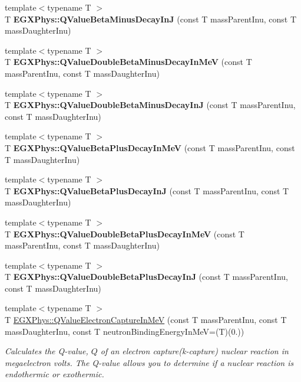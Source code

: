 \begin{DoxyCompactItemize}
{\footnotesize template$<$typename T $>$ }\\T {\bfseries E\+G\+X\+Phys\+::\+Q\+Value\+Beta\+Minus\+Decay\+InJ} (const T mass\+Parent\+Inu, const T mass\+Daughter\+Inu)
\item 
{\footnotesize template$<$typename T $>$ }\\T {\bfseries E\+G\+X\+Phys\+::\+Q\+Value\+Double\+Beta\+Minus\+Decay\+In\+MeV} (const T mass\+Parent\+Inu, const T mass\+Daughter\+Inu)
\item 
{\footnotesize template$<$typename T $>$ }\\T {\bfseries E\+G\+X\+Phys\+::\+Q\+Value\+Double\+Beta\+Minus\+Decay\+InJ} (const T mass\+Parent\+Inu, const T mass\+Daughter\+Inu)
\item 
{\footnotesize template$<$typename T $>$ }\\T {\bfseries E\+G\+X\+Phys\+::\+Q\+Value\+Beta\+Plus\+Decay\+In\+MeV} (const T mass\+Parent\+Inu, const T mass\+Daughter\+Inu)
\item 
{\footnotesize template$<$typename T $>$ }\\T {\bfseries E\+G\+X\+Phys\+::\+Q\+Value\+Beta\+Plus\+Decay\+InJ} (const T mass\+Parent\+Inu, const T mass\+Daughter\+Inu)
\item 
{\footnotesize template$<$typename T $>$ }\\T {\bfseries E\+G\+X\+Phys\+::\+Q\+Value\+Double\+Beta\+Plus\+Decay\+In\+MeV} (const T mass\+Parent\+Inu, const T mass\+Daughter\+Inu)
\item 
{\footnotesize template$<$typename T $>$ }\\T {\bfseries E\+G\+X\+Phys\+::\+Q\+Value\+Double\+Beta\+Plus\+Decay\+InJ} (const T mass\+Parent\+Inu, const T mass\+Daughter\+Inu)
\item 
{\footnotesize template$<$typename T $>$ }\\T \mbox{\hyperlink{group___e_g_x_phys-_q_value-_electron_capture_ga9cd8502b6101614c17114e9710cdcf6c}{E\+G\+X\+Phys\+::\+Q\+Value\+Electron\+Capture\+In\+MeV}} (const T mass\+Parent\+Inu, const T mass\+Daughter\+Inu, const T neutron\+Binding\+Energy\+In\+MeV=(T)(0.))
\begin{DoxyCompactList}\small\item\em Calculates the Q-\/value, $Q$ of an electron capture(k-\/capture) nuclear reaction in megaelectron volts. The Q-\/value allows you to determine if a nuclear reaction is endothermic or exothermic. \end{DoxyCompactList}\item 

\end{DoxyCompactItemize}
